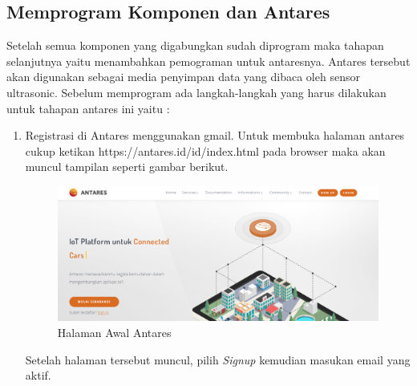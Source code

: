 \subsection{Memprogram Komponen dan Antares}
Setelah semua komponen yang digabungkan sudah diprogram maka tahapan selanjutnya yaitu menambahkan pemograman untuk antaresnya. Antares tersebut akan digunakan sebagai media penyimpan data yang dibaca oleh sensor ultrasonic. Sebelum memprogram ada langkah-langkah yang harus dilakukan untuk tahapan antares ini yaitu :
\begin{enumerate}
    \item Registrasi di Antares menggunakan gmail. Untuk membuka halaman antares cukup ketikan https://antares.id/id/index.html pada browser maka akan muncul tampilan seperti gambar berikut.
    \begin{figure}[H]
    \centering
    \includegraphics[width=1\textwidth]{figures/antares2.png}
    \caption{Halaman Awal Antares}
    \label{print}
    \end{figure}
    \par Setelah halaman tersebut muncul, pilih \textit{Signup} kemudian masukan email yang aktif.
    \begin{figure}[H]
    \centering

\end{figure}
\end{enumerate}
